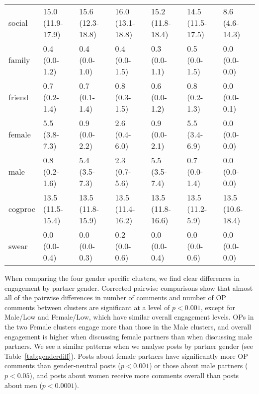 \begin{table*}
\begin{tabular}{l|l|l|l|l|l|l}
social & 15.0 (11.9-17.9) & 15.6 (12.3-18.8) & 16.0 (13.1-18.8) & 15.2 (11.8-18.4) & 14.5 (11.5-17.5) & 8.6 (4.6-14.3) \\
family & 0.4 (0.0-1.2) & 0.4 (0.0-1.0) & 0.4 (0.0-1.5) & 0.3 (0.0-1.1) & 0.5 (0.0-1.5) & 0.0 (0.0-0.0) \\
friend & 0.7 (0.2-1.4) & 0.7 (0.1-1.4) & 0.8 (0.3-1.5) & 0.6 (0.0-1.2) & 0.8 (0.2-1.3) &0.0 (0.0-0.1) \\
female & 5.5 (3.8-7.3) & 0.9 (0.0-2.2) & 2.6 (0.4-6.0) & 0.9 (0.0-2.1) & 5.5 (3.4-6.9) & 0.0 (0.0-0.0) \\
male & 0.8 (0.2-1.6) & 5.4 (3.5-7.3) & 2.3 (0.7-5.6) & 5.5 (3.5-7.4) & 0.7 (0.0-1.4) & 0.0 (0.0-0.0) \\
cogproc & 13.5 (11.5-15.4) & 13.5 (11.8-15.9) & 13.5 (11.4-16.2) & 13.5 (11.8-16.6) & 13.5 (11.2-5.9) & 13.5 (10.6-18.4) \\
swear & 0.0 (0.0-0.4) & 0.0 (0.0-0.3) & 0.2 (0.0-0.6) & 0.0 (0.0-0.4) & 0.0 (0.0-0.6) & 0.0 (0.0-0.0) \\
\hline
\end{tabular}
\end{table*}

When comparing the four gender specific clusters, we find clear differences in engagement by partner gender.  Corrected pairwise comparisons show that almost all of the pairwise differences in number of comments and number of OP comments between clusters are significant at a level of $p<0.001$, except for Male/Low and Female/Low, which have similar overall engagement levels. OPs in the two Female clusters engage more than those in the Male clusters, and overall engagement is higher when discussing female partners than when discussing male partners. We see a similar patterns when we analyse posts by partner gender (see Table~\ref{tab:genderdiff}). Posts about female partners have significantly more OP comments  than gender-neutral posts ($p<0.001$) or those about male partners ($p<0.05$), and posts about women receive more comments overall than posts about men ($p<0.0001$). 


